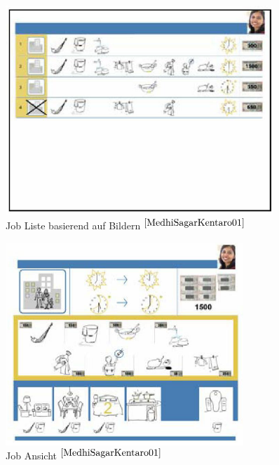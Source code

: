 \begin{figure}[h]
	\centering
		\includegraphics[width=0.90\textwidth]{Daten/job_list.PNG}
	\caption{Job Liste basierend auf Bildern $^{\ref{MedhiSagarKentaro01}}$}
	\label{fig:joblist}
\end{figure}


\begin{figure}[h]
	\centering
		\includegraphics[width=0.8\textwidth]{Daten/job_close.PNG}
	\caption{Job Ansicht $^{\ref{MedhiSagarKentaro01}}$}
	\label{fig:jobclose}
\end{figure}

\clearpage
